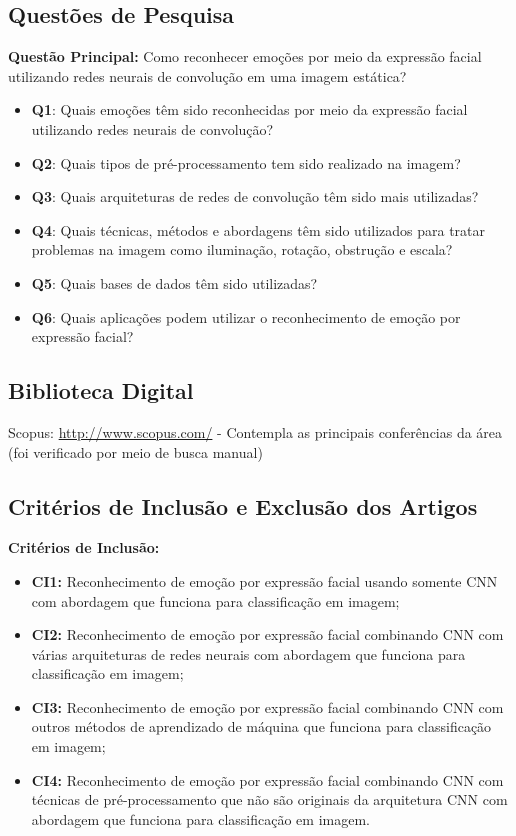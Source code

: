 \subsection{Questões de Pesquisa}
\textbf{Questão Principal:} Como reconhecer emoções por meio da expressão facial utilizando redes neurais de convolução em uma imagem estática?
\begin{itemize}
 \item \textbf{Q1}: Quais emoções têm sido reconhecidas por meio da expressão facial utilizando redes neurais de convolução? 
 \item \textbf{Q2}: Quais tipos de pré-processamento tem sido realizado na imagem?
 \item \textbf{Q3}: Quais arquiteturas de redes de convolução têm sido mais utilizadas?
 \item \textbf{Q4}: Quais técnicas, métodos e abordagens têm sido utilizados para tratar problemas na imagem como iluminação, rotação, obstrução e escala?
 \item \textbf{Q5}: Quais bases de dados têm sido utilizadas?
 \item \textbf{Q6}: Quais aplicações podem utilizar o reconhecimento de emoção por expressão facial?
\end{itemize}

\subsection{Biblioteca Digital}
Scopus: \url{http://www.scopus.com/} - Contempla as principais conferências da área (foi verificado por meio de busca manual)

\subsection{Critérios de Inclusão e Exclusão dos Artigos}
\textbf{Critérios de Inclusão:}
\begin{itemize}
 \item \textbf{CI1:} Reconhecimento de emoção por expressão facial usando somente CNN com abordagem que funciona para classificação em imagem;
 \item \textbf{CI2:} Reconhecimento de emoção por expressão facial combinando CNN com várias arquiteturas de redes neurais com abordagem que funciona para classificação em imagem;
 \item \textbf{CI3:} Reconhecimento de emoção por expressão facial combinando CNN com outros métodos de aprendizado de máquina que funciona para classificação em imagem;
 \item \textbf{CI4:} Reconhecimento de emoção por expressão facial combinando CNN com técnicas de pré-processamento que não são originais da arquitetura CNN com abordagem que funciona para classificação em imagem.
 \end{itemize}
 
